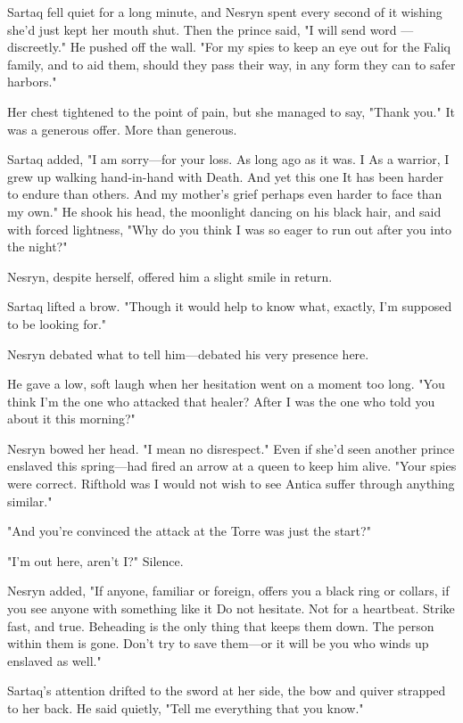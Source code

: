 Sartaq fell quiet for a long minute, and Nesryn spent every second of it wishing she'd just kept her mouth shut. Then the prince said, "I will send word ---discreetly." He pushed off the wall. "For my spies to keep an eye out for the Faliq family, and to aid them, should they pass their way, in any form they can to safer harbors."

Her chest tightened to the point of pain, but she managed to say, "Thank you." It was a generous offer. More than generous.

Sartaq added, "I am sorry---for your loss. As long ago as it was. I
 As a warrior, I grew up walking hand-in-hand with Death. And yet this one  It has been harder to endure than others. And my mother's grief perhaps even harder to face than my own." He shook his head, the moonlight dancing on his black hair, and said with forced lightness, "Why do you think I was so eager to run out after you into the night?"

Nesryn, despite herself, offered him a slight smile in return.

Sartaq lifted a brow. "Though it would help to know what, exactly, I'm supposed to be looking for."

Nesryn debated what to tell him---debated his very presence here.

He gave a low, soft laugh when her hesitation went on a moment too long. "You think I'm the one who attacked that healer? After I was the one who told you about it this morning?"

Nesryn bowed her head. "I mean no disrespect." Even if she'd seen another prince enslaved this spring---had fired an arrow at a queen to keep him alive. "Your spies were correct. Rifthold was  I would not wish to see Antica suffer through anything similar."

"And you're convinced the attack at the Torre was just the start?"

"I'm out here, aren't I?" Silence.

Nesryn added, "If anyone, familiar or foreign, offers you a black ring or collars, if you see anyone with something like it  Do not hesitate. Not for a heartbeat. Strike fast, and true. Beheading is the only thing that keeps them down. The person within them is gone. Don't try to save them---or it will be you who winds up enslaved as well."

Sartaq's attention drifted to the sword at her side, the bow and quiver strapped to her back. He said quietly, "Tell me everything that you know."

